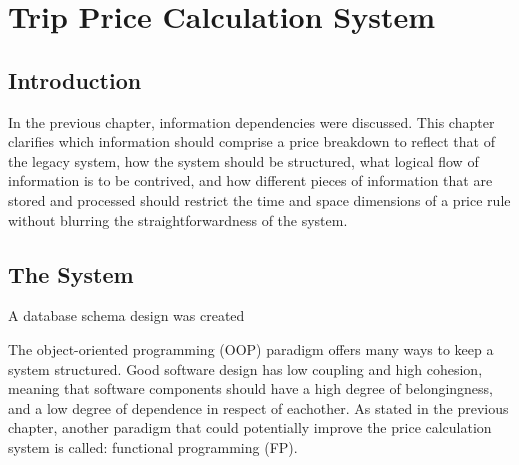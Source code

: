 \graphicspath{{Chapter4/Figs/Vector/}{Chapter4/Figs/}}

%
\chapter{Trip Price Calculation System}
\section{Introduction}
In the previous chapter, information dependencies were discussed. This chapter clarifies which information should comprise a price breakdown to reflect that of the legacy system, how the system should be structured, what logical flow of information is to be contrived, and how different pieces of information that are stored and processed should restrict the time and space dimensions of a price rule without blurring the straightforwardness of the system.

%
\section{The System}
A database schema design was created


%
The object-oriented programming (OOP) paradigm offers many ways to keep a system structured. Good software design has low coupling and high cohesion, meaning that software components should have a high degree of belongingness, and a low degree of dependence in respect of eachother. As stated in the previous chapter, another paradigm that could potentially improve the price calculation system is called: functional programming (FP).


